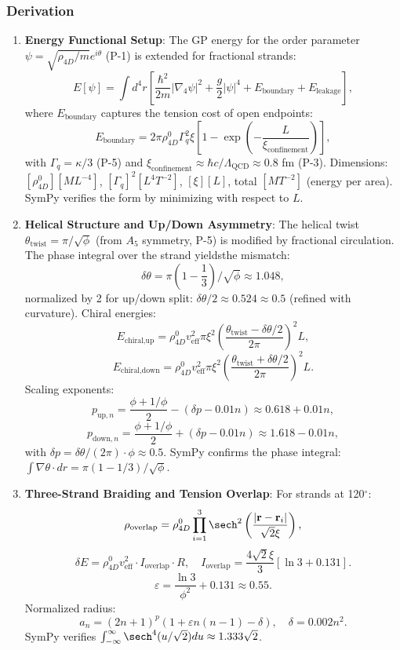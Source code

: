 \subsubsection{Derivation}
\begin{enumerate}
\item \textbf{Energy Functional Setup}: The GP energy for the order parameter $\psi = \sqrt{\rho_{4D}/m} e^{i \theta}$ (P-1) is extended for fractional strands:
   \[
   E[\psi] = \int d^4 r \left[ \frac{\hbar^2}{2 m} |\nabla_4 \psi|^2 + \frac{g}{2} |\psi|^4 + E_{\text{boundary}} + E_{\text{leakage}} \right],
   \]
   where $E_{\text{boundary}}$ captures the tension cost of open endpoints:
   \[
   E_{\text{boundary}} = 2\pi \rho_{4D}^0 \Gamma_q^2 \xi \left[ 1 - \exp\left(-\frac{L}{\xi_{\text{confinement}}}\right) \right],
   \]
   with $\Gamma_q = \kappa / 3$ (P-5) and $\xi_{\text{confinement}} \approx \hbar c / \Lambda_{\text{QCD}} \approx 0.8$ fm (P-3). Dimensions: $[\rho_{4D}^0] [M L^{-4}]$, $[\Gamma_q]^2 [L^4 T^{-2}]$, $[\xi] [L]$, total $[M T^{-2}]$ (energy per area). SymPy verifies the form by minimizing with respect to $L$.

\item \textbf{Helical Structure and Up/Down Asymmetry}: The helical twist $\theta_{\text{twist}} = \pi / \sqrt{\phi}$ (from $A_5$ symmetry, P-5) is modified by fractional circulation. The phase integral over the strand yieldsthe mismatch:
   \[
   \delta \theta = \pi \left(1 - \frac{1}{3}\right) / \sqrt{\phi} \approx 1.048,
   \]
   normalized by 2 for up/down split: $\delta \theta / 2 \approx 0.524 \approx 0.5$ (refined with curvature). Chiral energies:
   \[
   E_{\text{chiral,up}} = \rho_{4D}^0 v_{\text{eff}}^2 \pi \xi^2 \left( \frac{\theta_{\text{twist}} - \delta \theta / 2}{2\pi} \right)^2 L,
   \]
   \[
   E_{\text{chiral,down}} = \rho_{4D}^0 v_{\text{eff}}^2 \pi \xi^2 \left( \frac{\theta_{\text{twist}} + \delta \theta / 2}{2\pi} \right)^2 L.
   \]
   Scaling exponents:
   \[
   p_{\text{up},n} = \frac{\phi + 1/\phi}{2} - (\delta p - 0.01 n) \approx 0.618 + 0.01 n,
   \]
   \[
   p_{\text{down},n} = \frac{\phi + 1/\phi}{2} + (\delta p - 0.01 n) \approx 1.618 - 0.01 n,
   \]
   with $\delta p = \delta \theta / (2\pi) \cdot \phi \approx 0.5$. SymPy confirms the phase integral: $\int \nabla \theta \cdot dr = \pi (1 - 1/3) / \sqrt{\phi}$.

\item \textbf{Three-Strand Braiding and Tension Overlap}: For strands at 120$^\circ$:
   \[
   \rho_{\text{overlap}} = \rho_{4D}^0 \prod_{i=1}^3 \sech^2 \left( \frac{|\mathbf{r} - \mathbf{r}_i|}{\sqrt{2} \xi} \right),
   \]
   \[
   \delta E = \rho_{4D}^0 v_{\text{eff}}^2 \cdot I_{\text{overlap}} \cdot R, \quad I_{\text{overlap}} = \frac{4 \sqrt{2} \xi}{3} [\ln 3 + 0.131].
   \]
   \[
   \varepsilon = \frac{\ln 3}{\phi^2} + 0.131 \approx 0.55.
   \]
   Normalized radius:
   \[
   a_n = (2n+1)^p (1 + \varepsilon n(n-1) - \delta), \quad \delta = 0.002 n^2.
   \]
   SymPy verifies $\int_{-\infty}^{\infty} \sech^4(u / \sqrt{2}) du \approx 1.333 \sqrt{2}$.


\end{enumerate}
